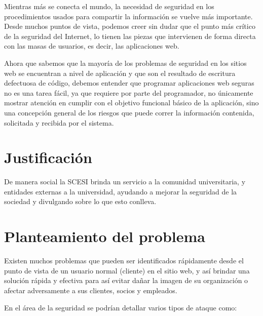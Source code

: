 \documentclass[letter,twoside,11pt]{article}
\begin{document}
Mientras más se conecta el mundo, la necesidad de seguridad en los
procedimientos usados para compartir la información se vuelve más importante.
Desde muchos puntos de vista, podemos creer sin dudar que el punto más crítico
de la seguridad del Internet, lo tienen las piezas que intervienen de forma
directa con las masas de usuarios, es decir, las aplicaciones web.

Ahora que sabemos que la mayoría de los problemas de seguridad en los sitios web
se encuentran a nivel de aplicación y que son el resultado de escritura
defectuosa de código, debemos entender que programar aplicaciones web seguras
no es una tarea fácil, ya que requiere por parte del programador, no únicamente
mostrar atención en cumplir con el objetivo funcional básico de la aplicación,
sino una concepción general de los riesgos que puede correr la información
contenida, solicitada y recibida por el sistema.

\section{Justificación}
De manera social la SCESI brinda un servicio a la comunidad universitaria, y
entidades externas a la universidad, ayudando a mejorar la seguridad de la
sociedad y divulgando sobre lo que esto conlleva.

\section{Planteamiento del problema}
Existen muchos problemas que pueden ser identificados rápidamente desde el punto
de vista de un usuario normal (cliente) en el sitio web, y así brindar una
solución rápida y efectiva para así evitar dañar la imagen de su organización o
afectar adversamente a sus clientes, socios y empleados.

En el área de la seguridad se podrían detallar varios tipos de ataque como:
\end{document}
